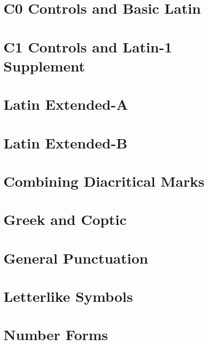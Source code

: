 \documentclass{article}
\begin{document}
\section{C0 Controls and Basic Latin}

\section{C1 Controls and Latin-1 Supplement}

\section{Latin Extended-A}

\section{Latin Extended-B}

%
%
\section{Combining Diacritical Marks}

\section{Greek and Coptic}

\section{General Punctuation}

\section{Letterlike Symbols}

\section{Number Forms}
\end{document}
